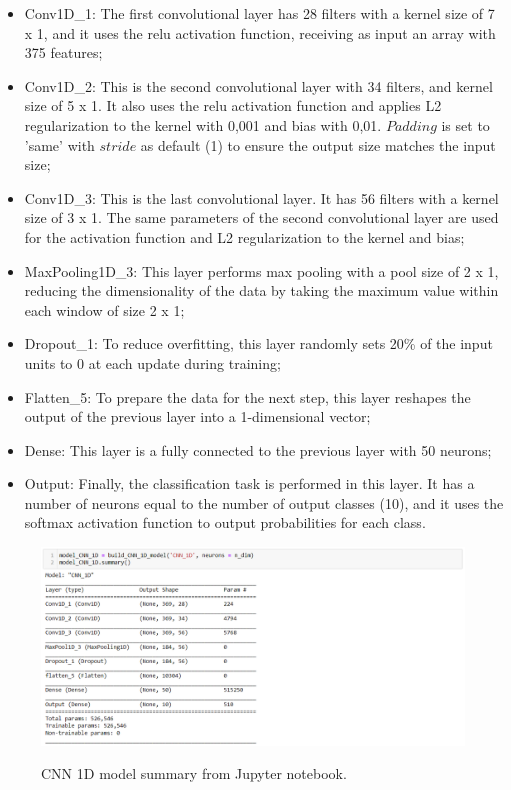 \begin{itemize}
    \item Conv1D\_1: The first convolutional layer has 28 filters with a kernel size of 7 x 1, and it uses the \gls{relu} activation function, receiving as input an array with 375 features;
    \item Conv1D\_2: This is the second convolutional layer with 34 filters, and kernel size of 5 x 1. It also uses the \gls{relu} activation function and applies L2 regularization to the kernel with 0,001 and bias with 0,01. $Padding$ is set to 'same' with $stride$ as default (1) to ensure the output size matches the input size;
    \item Conv1D\_3: This is the last convolutional layer. It has 56 filters with a kernel size of 3 x 1. The same parameters of the second convolutional layer are used for the activation function and L2 regularization to the kernel and bias;
    \item MaxPooling1D\_3: This layer performs max pooling with a pool size of 2 x 1, reducing the dimensionality of the data by taking the maximum value within each window of size 2 x 1;
    \item Dropout\_1: To reduce overfitting, this layer randomly sets 20\% of the input units to 0 at each update during training; 
    \item Flatten\_5: To prepare the data for the next step, this layer reshapes the output of the previous layer into a 1-dimensional vector;
    \item Dense: This layer is a fully connected to the previous layer with 50 neurons; 
    \item Output: Finally, the classification task is performed in this layer. It has a number of neurons equal to the number of output classes (10), and it uses the softmax activation function to output probabilities for each class.
\end{itemize}

\begin{figure}[htbp]
    \raggedright
        \caption{CNN 1D model summary from Jupyter notebook.}
        \includegraphics[width=1\textwidth]{resources/images/050-methods/Methods_training_CNN1D_architecture_jupyter_notebook.png}
        \label{fig:methods_training_CNN_1D_architecture_jupyter_notebook}
\end{figure} 

